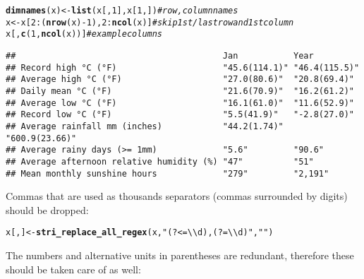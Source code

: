 \documentclass[nojss]{jss}\usepackage[]{graphicx}\usepackage[]{xcolor}
\makeatletter
\newcommand{\hlnum}[1]{\textcolor[rgb]{0.686,0.059,0.569}{#1}}%
\newcommand{\hlstr}[1]{\textcolor[rgb]{0.192,0.494,0.8}{#1}}%
\newcommand{\hlcom}[1]{\textcolor[rgb]{0.678,0.584,0.686}{\textit{#1}}}%
\newcommand{\hlopt}[1]{\textcolor[rgb]{0,0,0}{#1}}%
\newcommand{\hlstd}[1]{\textcolor[rgb]{0.345,0.345,0.345}{#1}}%
\newcommand{\hlkwb}[1]{\textcolor[rgb]{0.69,0.353,0.396}{#1}}%
\newcommand{\hlkwd}[1]{\textcolor[rgb]{0.737,0.353,0.396}{\textbf{#1}}}%
\newenvironment{kframe}{%
 \def\at@end@of@kframe{}%
 \ifinner\ifhmode%
  \def\at@end@of@kframe{\end{minipage}}%
  \begin{minipage}{\columnwidth}%
 \fi\fi%
 \def\FrameCommand##1{\hskip\@totalleftmargin \hskip-\fboxsep
 \colorbox{shadecolor}{##1}\hskip-\fboxsep
     \hskip-\linewidth \hskip-\@totalleftmargin \hskip\columnwidth}%
 \MakeFramed {\advance\hsize-\width
   \@totalleftmargin\z@ \linewidth\hsize
   \@setminipage}}%
 {\par\unskip\endMakeFramed%
 \at@end@of@kframe}
\newenvironment{knitrout}{}{} %
\makeatother
\begin{document}
\begin{knitrout}
\color{fgcolor}\begin{kframe}
\begin{alltt}
\hlkwd{dimnames}\hlstd{(x)} \hlkwb{<-} \hlkwd{list}\hlstd{(x[,} \hlnum{1}\hlstd{], x[}\hlnum{1}\hlstd{, ])}  \hlcom{# row, column names}
\hlstd{x} \hlkwb{<-} \hlstd{x[}\hlnum{2}\hlopt{:}\hlstd{(}\hlkwd{nrow}\hlstd{(x)} \hlopt{-} \hlnum{1}\hlstd{),} \hlnum{2}\hlopt{:}\hlkwd{ncol}\hlstd{(x)]}   \hlcom{# skip 1st/last row and 1st column}
\hlstd{x[,} \hlkwd{c}\hlstd{(}\hlnum{1}\hlstd{,} \hlkwd{ncol}\hlstd{(x))]}                   \hlcom{# example columns}
\end{alltt}
\begin{verbatim}
##                                         Jan           Year          
## Record high °C (°F)                     "45.6(114.1)" "46.4(115.5)" 
## Average high °C (°F)                    "27.0(80.6)"  "20.8(69.4)"  
## Daily mean °C (°F)                      "21.6(70.9)"  "16.2(61.2)"  
## Average low °C (°F)                     "16.1(61.0)"  "11.6(52.9)"  
## Record low °C (°F)                      "5.5(41.9)"   "-2.8(27.0)"  
## Average rainfall mm (inches)            "44.2(1.74)"  "600.9(23.66)"
## Average rainy days (>= 1mm)             "5.6"         "90.6"        
## Average afternoon relative humidity (%) "47"          "51"          
## Mean monthly sunshine hours             "279"         "2,191"
\end{verbatim}
\end{kframe}
\end{knitrout}

Commas that are used as thousands separators (commas surrounded
by digits) should be dropped:

\begin{knitrout}
\color{fgcolor}\begin{kframe}
\begin{alltt}
\hlstd{x[, ]} \hlkwb{<-} \hlkwd{stri_replace_all_regex}\hlstd{(x,} \hlstr{"(?<=\textbackslash{}\textbackslash{}d),(?=\textbackslash{}\textbackslash{}d)"}\hlstd{,} \hlstr{""}\hlstd{)}
\end{alltt}
\end{kframe}
\end{knitrout}

The numbers and alternative units in parentheses are redundant,
therefore these should be taken care of as well:
\end{document}
